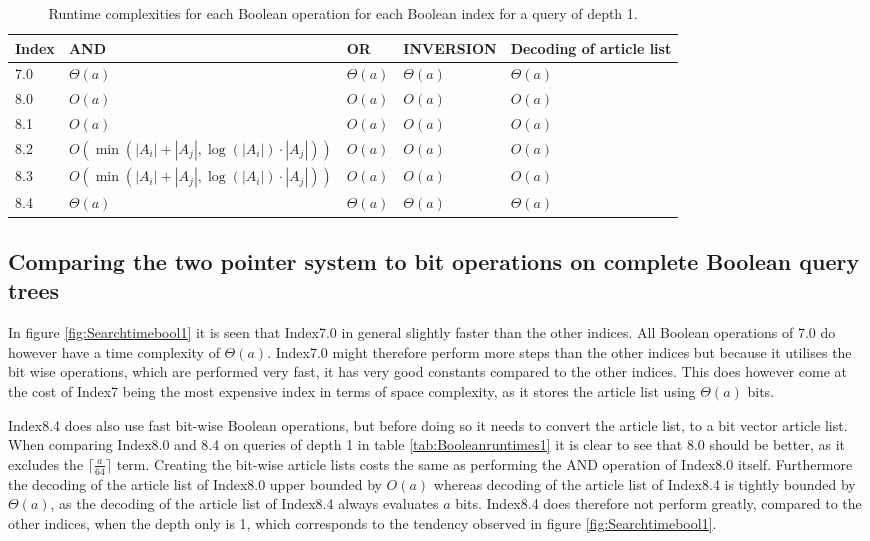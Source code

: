 \begin{table}[H]
\begin{tabular}{l|lllp{2cm}}
    Index & AND & OR & INVERSION & Decoding of article list\\
\hline
7.0 &  $\Theta(a)$   &  $\Theta(a)$  &  $\Theta(a)$ & $\Theta(a)$         \\
8.0 &  $O(a)$   &  $O(a)$  &  $O(a)$  & $O(a)$       \\
8.1 &  $O(a)$   &  $O(a)$  &  $O(a)$  & $O(a)$         \\
8.2 &  $O(\min(|A_i| + |A_j|, \log(|A_i|)\cdot |A_j|))$   &  $O(a)$  &  $O(a)$  & $O(a)$    \\
8.3 &  $O(\min(|A_i| + |A_j|, \log(|A_i|)\cdot |A_j|))$   &  $O(a)$  &  $O(a)$  & $O(a)$     \\
8.4 &  $\Theta(a)$   &   $\Theta(a)$   &  $\Theta(a)$   & $\Theta(a)$
\end{tabular}
\caption{Runtime complexities for each Boolean operation for each Boolean index for a query of depth 1. }
\label{tab:BooleanruntimesO}
\end{table}

\subsection{Comparing the two pointer system to bit operations on complete Boolean query trees}

In figure \ref{fig:Searchtimebool1} it is seen that Index7.0 in general slightly faster than the other indices. All Boolean operations of 7.0 do however have a time complexity of $\Theta(a)$. Index7.0 might therefore perform more steps than the other indices but because it utilises the bit wise operations, which are performed very fast, it has very good constants compared to the other indices. This does however come at the cost of Index7 being the most expensive index in terms of space complexity, as it stores the article list using $\Theta(a)$ bits. 

Index8.4 does also use fast bit-wise Boolean operations, but before doing so it needs to convert the article list, to a bit vector article list. When comparing Index8.0 and 8.4 on queries of depth 1 in table \ref{tab:Booleanruntimes1} it is clear to see that 8.0 should be better, as it excludes the $\lceil \frac{a}{64} \rceil$ term. Creating the bit-wise article lists costs the same as performing the AND operation of Index8.0 itself. Furthermore the decoding of the article list of Index8.0 upper bounded by $O(a)$ whereas decoding of the article list of Index8.4 is tightly bounded by $\Theta(a)$, as the decoding of the article list of Index8.4 always evaluates $a$ bits. Index8.4 does therefore not perform greatly, compared to the other indices, when the depth only is 1, which corresponds to the tendency observed in figure \ref{fig:Searchtimebool1}.

